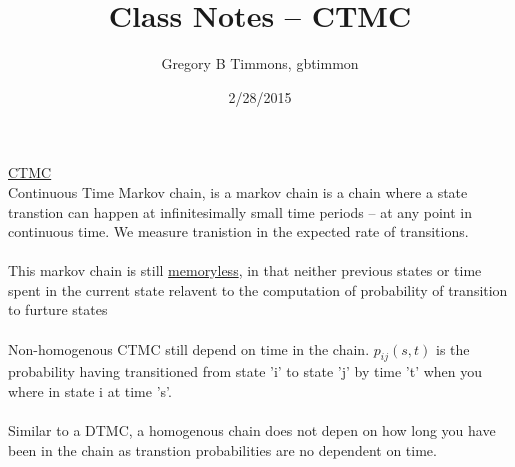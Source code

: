 \documentclass{article}
\begin{document}
	\title{Class Notes -- CTMC}
	\date{2/28/2015}
	\author{Gregory B Timmons, gbtimmon}
	\maketitle
\underline{CTMC} \\
 Continuous Time Markov chain, is a markov chain is a chain
where a state transtion can happen at infinitesimally small time periods -- at any
point in continuous time. We measure tranistion in the expected rate of
transitions.
\\
\\This markov chain is still \underline{memoryless}, in that neither previous
states or time spent in the current state relavent to the computation of
probability of transition to furture states
\\
\\Non-homogenous CTMC still depend on time in the chain. $p_{ij}(s,t)$ is the
probability having transitioned from state 'i' to state 'j' by time 't' when you
where in state i at time 's'.
\\
\\Similar to a DTMC, a homogenous chain does not depen on how long you have
been in the chain as transtion probabilities are no dependent on time. 
\end{document}
